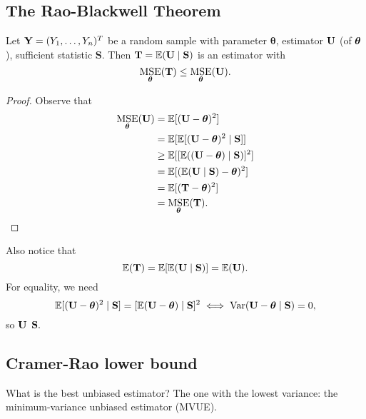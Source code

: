 
\subsection{The Rao-Blackwell Theorem}

\begin{theorem}
Let $\YY=(Y_1,\ldots, Y_n)^T$ be a random sample with parameter $\boldsymbol \theta$, estimator $\UU$ (of $\btheta$), sufficient statistic $\mathbf S$. Then $\mathbf T=\EE(\UU\mid \bS)$ is an estimator with
$$
\MSE_{\btheta}(\bT)\leq \MSE_\btheta(\UU).
$$
\end{theorem}

\begin{proof}
Observe that
\begin{align*}
		\MSE_\btheta(\UU)&=\EE[(\UU-\btheta)^2] \\
    &=\EE[\EE[(\UU-\btheta)^2\mid \bS]] \\
    &\geq \EE[[\EE((\UU-\btheta)\mid \bS)]^2] \\
    &=\EE[(\EE(\UU\mid \bS)-\btheta)^2] \\
    &=\EE[(\bT-\btheta)^2] \\
    &=\MSE_\btheta(\bT).
\end{align*}
\end{proof}
Also notice that 
$$\EE(\bT)=\EE[\EE(\UU\mid\bS)]=\EE(\UU).$$
For equality, we need
$$
\EE[(\UU-\btheta)^2\mid \bS]=[\EE(\UU-\btheta)\mid \bS]^2 \iff \Var(\UU-\btheta \mid \bS)=0,
$$
so $\UU$  $\bS.$ 

\subsection{Cramer-Rao lower bound}

What is the best unbiased estimator? The one with the lowest variance: the minimum-variance unbiased estimator (MVUE).

